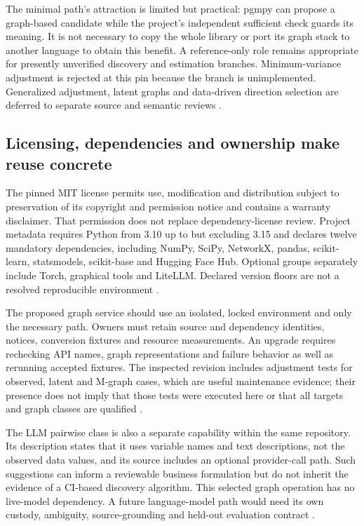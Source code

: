 The minimal path's attraction is limited but practical: pgmpy can propose
a graph-based candidate while the project's independent sufficient check
guards its meaning. It is not necessary to copy the whole library or
port its graph stack to another language to obtain this benefit. A
reference-only role remains appropriate for presently unverified discovery
and estimation branches. Minimum-variance adjustment is rejected at this
pin because the branch is unimplemented. Generalized adjustment, latent
graphs and data-driven direction selection are deferred to separate
source and semantic reviews \cite{exec13_pgmpy_reuse_primary}.

\subsection{Licensing, dependencies and ownership make reuse concrete}

The pinned MIT license permits use, modification and distribution subject
to preservation of its copyright and permission notice and contains a
warranty disclaimer. That permission does not replace dependency-license
review. Project metadata requires Python from 3.10 up to but excluding
3.15 and declares twelve mandatory dependencies, including NumPy,
SciPy, NetworkX, pandas, scikit-learn, statsmodels, scikit-base and
Hugging Face Hub. Optional groups separately include Torch, graphical
tools and LiteLLM. Declared version floors are not a resolved reproducible
environment \cite{exec13_pgmpy_reuse_primary}.

The proposed graph service should use an isolated, locked environment and
only the necessary path. Owners must retain source and dependency identities,
notices, conversion fixtures and resource measurements. An upgrade requires
rechecking API names, graph representations and failure behavior as well as
rerunning accepted fixtures. The inspected revision includes adjustment
tests for observed, latent and M-graph cases, which are useful maintenance
evidence; their presence does not imply that those tests were executed here
or that all targets and graph classes are qualified
\cite{exec13_pgmpy_reuse_primary}.

The LLM pairwise class is also a separate capability within the same
repository. Its description states that it uses variable names and text
descriptions, not the observed data values, and its source includes an
optional provider-call path. Such suggestions can inform a reviewable
business formulation but do not inherit the evidence of a CI-based
discovery algorithm. This selected graph operation has no live-model
dependency. A future language-model path would need its own custody,
ambiguity, source-grounding and held-out evaluation contract
\cite{exec13_pgmpy_reuse_primary}.

